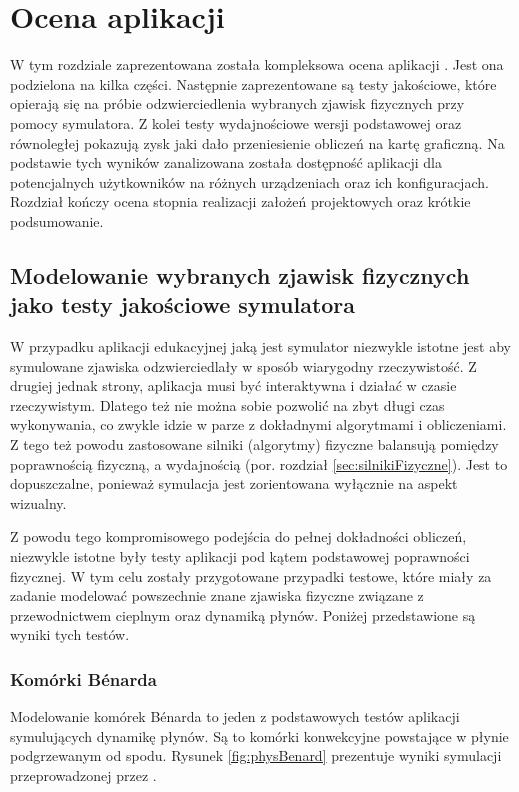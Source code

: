 \chapter{Ocena aplikacji}
\label{cha:ocena}

W tym rozdziale zaprezentowana została kompleksowa ocena aplikacji \en. Jest ona
podzielona na kilka części. Następnie zaprezentowane są testy jakościowe, które
opierają się na próbie odzwierciedlenia wybranych zjawisk fizycznych przy pomocy
symulatora. Z kolei testy wydajnościowe wersji podstawowej oraz równoległej \en
pokazują zysk jaki dało przeniesienie obliczeń na kartę graficzną. Na podstawie
tych wyników zanalizowana została dostępność aplikacji dla potencjalnych
użytkowników na różnych urządzeniach oraz ich konfiguracjach. Rozdział kończy
ocena stopnia realizacji założeń projektowych oraz krótkie podsumowanie.

\section{Modelowanie wybranych zjawisk fizycznych jako testy jakościowe symulatora}

W przypadku aplikacji edukacyjnej jaką jest symulator \en niezwykle istotne jest
aby symulowane zjawiska odzwierciedlały w sposób  wiarygodny rzeczywistość. Z
drugiej jednak strony, aplikacja musi być interaktywna i działać w czasie
rzeczywistym. Dlatego też nie można sobie pozwolić na zbyt długi czas
wykonywania, co zwykle idzie w parze z dokładnymi algorytmami i obliczeniami. Z
tego też powodu zastosowane silniki (algorytmy) fizyczne balansują pomiędzy
poprawnością fizyczną, a wydajnością (por. rozdział \ref{sec:silnikiFizyczne}).
Jest to dopuszczalne, ponieważ symulacja jest zorientowana wyłącznie na aspekt
wizualny.

Z powodu tego kompromisowego podejścia do pełnej dokładności obliczeń, niezwykle
istotne były testy aplikacji pod kątem podstawowej poprawności fizycznej. W tym
celu zostały przygotowane przypadki testowe, które miały za zadanie modelować
powszechnie znane zjawiska fizyczne związane z przewodnictwem cieplnym oraz
dynamiką płynów. Poniżej przedstawione są wyniki tych testów.

\subsection{Komórki Bénarda}

Modelowanie komórek Bénarda to jeden z podstawowych testów aplikacji
symulujących dynamikę płynów. Są to komórki konwekcyjne powstające w płynie
podgrzewanym od spodu. Rysunek \ref{fig:physBenard} prezentuje wyniki symulacji
przeprowadzonej przez \en.


